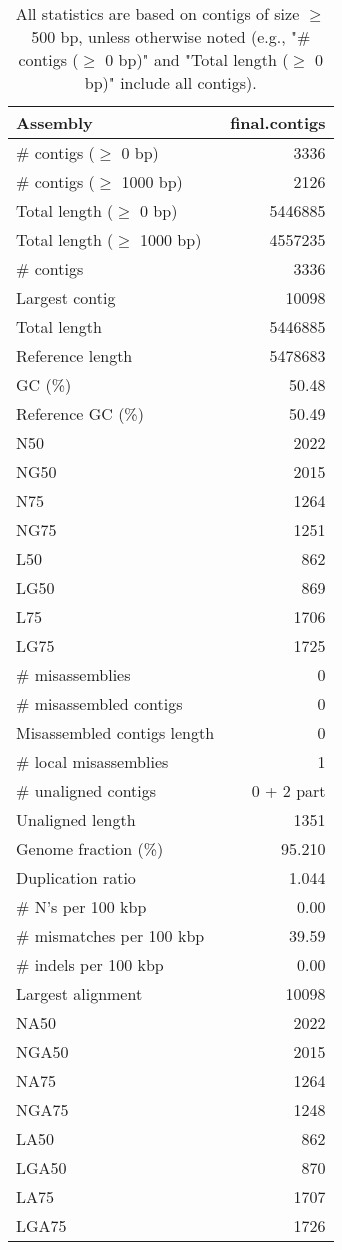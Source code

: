 \documentclass[12pt,a4paper]{article}
\begin{document}
\begin{table}[ht]
\begin{center}
\caption{All statistics are based on contigs of size $\geq$ 500 bp, unless otherwise noted (e.g., "\# contigs ($\geq$ 0 bp)" and "Total length ($\geq$ 0 bp)" include all contigs).}
\begin{tabular}{|l*{1}{|r}|}
\hline
Assembly & final.contigs \\ \hline
\# contigs ($\geq$ 0 bp) & 3336 \\ \hline
\# contigs ($\geq$ 1000 bp) & 2126 \\ \hline
Total length ($\geq$ 0 bp) & 5446885 \\ \hline
Total length ($\geq$ 1000 bp) & 4557235 \\ \hline
\# contigs & 3336 \\ \hline
Largest contig & 10098 \\ \hline
Total length & 5446885 \\ \hline
Reference length & 5478683 \\ \hline
GC (\%) & 50.48 \\ \hline
Reference GC (\%) & 50.49 \\ \hline
N50 & 2022 \\ \hline
NG50 & 2015 \\ \hline
N75 & 1264 \\ \hline
NG75 & 1251 \\ \hline
L50 & 862 \\ \hline
LG50 & 869 \\ \hline
L75 & 1706 \\ \hline
LG75 & 1725 \\ \hline
\# misassemblies & 0 \\ \hline
\# misassembled contigs & 0 \\ \hline
Misassembled contigs length & 0 \\ \hline
\# local misassemblies & 1 \\ \hline
\# unaligned contigs & 0 + 2 part \\ \hline
Unaligned length & 1351 \\ \hline
Genome fraction (\%) & 95.210 \\ \hline
Duplication ratio & 1.044 \\ \hline
\# N's per 100 kbp & 0.00 \\ \hline
\# mismatches per 100 kbp & 39.59 \\ \hline
\# indels per 100 kbp & 0.00 \\ \hline
Largest alignment & 10098 \\ \hline
NA50 & 2022 \\ \hline
NGA50 & 2015 \\ \hline
NA75 & 1264 \\ \hline
NGA75 & 1248 \\ \hline
LA50 & 862 \\ \hline
LGA50 & 870 \\ \hline
LA75 & 1707 \\ \hline
LGA75 & 1726 \\ \hline
\end{tabular}
\end{center}
\end{table}
\end{document}
